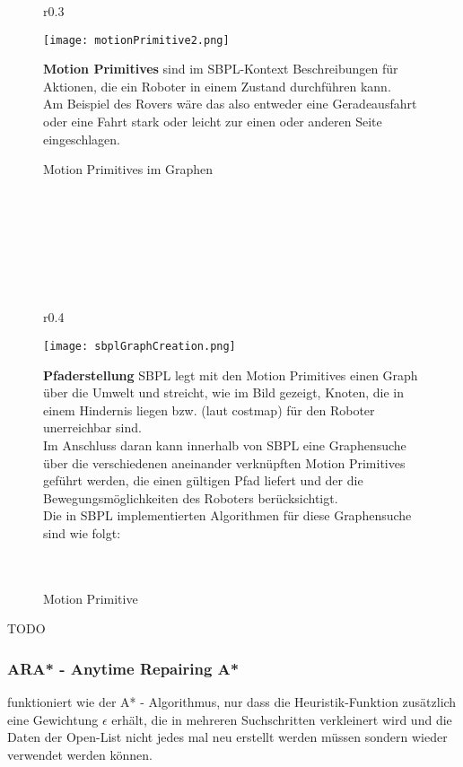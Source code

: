 \documentclass[oribibl]{llncs}
\begin{document}
{
\begin{figure}
\begin{wrapfigure}[12]{r}{0.3\textwidth}
  \begin{center}
  \vspace{-30pt}
    \texttt{[image: motionPrimitive2.png]}
    \caption{Motion Primitives im Graphen}
	\cite{SBPLRosSchool}
  \end{center}
\end{wrapfigure}
\textbf{Motion Primitives} sind im SBPL-Kontext Beschreibungen für Aktionen, die ein Roboter in einem Zustand durchführen kann.\\
Am Beispiel des Rovers wäre das also entweder eine Geradeausfahrt oder eine Fahrt stark oder leicht zur einen oder anderen Seite eingeschlagen.
\end{figure}
\\\\\\\\\\\\
\begin{figure}
\begin{wrapfigure}[15]{r}{0.4\textwidth}
  \begin{center}
  \vspace{-20pt}
    \texttt{[image: sbplGraphCreation.png]}
    \caption{Motion Primitive}
	\cite{SBPLRosSchool}
  \end{center}
\end{wrapfigure}
\textbf{Pfaderstellung} SBPL legt mit den Motion Primitives einen Graph über die Umwelt und streicht, wie im Bild gezeigt, Knoten, die in einem Hindernis liegen bzw. (laut costmap) für den Roboter unerreichbar sind.\\
Im Anschluss daran kann innerhalb von SBPL eine Graphensuche über die verschiedenen aneinander verknüpften Motion Primitives geführt werden, die einen gültigen Pfad liefert und der die Bewegungsmöglichkeiten des Roboters berücksichtigt.\\
Die in SBPL implementierten Algorithmen für diese Graphensuche sind wie folgt:\\\\\\
\end{figure}
}
TODO
\newpage
\subsubsection{ARA* - Anytime Repairing A*} funktioniert wie der A* - Algorithmus, nur dass die Heuristik-Funktion zusätzlich eine Gewichtung $\epsilon$ erhält, die in mehreren Suchschritten verkleinert wird und die Daten der Open-List nicht jedes mal neu erstellt werden müssen sondern wieder verwendet werden können.\\
\end{document}
